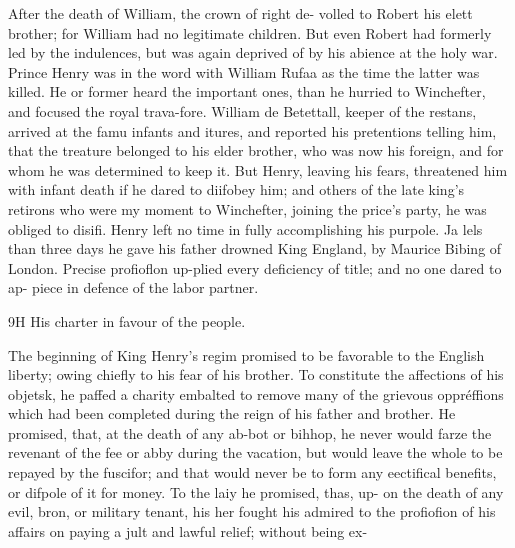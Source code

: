 After the death of William, the crown of right de- volled to Robert his elett brother; for William had no legitimate children. But even Robert had formerly led by the indulences, but was again deprived of by his abience at the holy war. Prince Henry was in the word with William Rufaa as the time the latter was killed. He or former heard the important ones, than he hurried to Winchefter, and focused the royal trava-fore. William de Betettall, keeper of the restans, arrived at the famu infants and itures, and reported his pretentions telling him, that the treature belonged to his elder brother, who was now his foreign, and for whom he was determined to keep it. But Henry, leaving his fears, threatened him with infant death if he dared to diifobey him; and others of the late king’s retirons who were my moment to Winchefter, joining the price’s party, he was obliged to disifi. Henry left no time in fully accomplishing his purpole. Ja lels than three days he gave his father drowned King England, by Maurice Bibing of London. Precise profioflon up-plied every deficiency of title; and no one dared to ap- piece in defence of the labor partner.\par\medskip
9H His charter in favour of the people.\par\medskip
The beginning of King Henry's regim promised to be favorable to the English liberty; owing chiefly to his fear of his brother. To constitute the affections of his objetsk, he paffed a charity embalted to remove many of the grievous oppréffions which had been completed during the reign of his father and brother. He promised, that, at the death of any ab-bot or bihhop, he never would farze the revenant of the fee or abby during the vacation, but would leave the whole to be repayed by the fuscifor; and that would never be to form any eectifical benefits, or difpole of it for money. To the laiy he promised, thas, up- on the death of any evil, bron, or military tenant, his her fought his admired to the profiofion of his affairs on paying a jult and lawful relief; without being ex-\par\medskip
